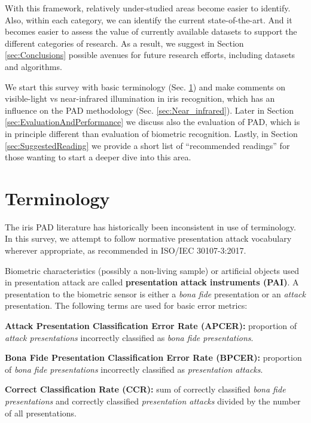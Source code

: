 \documentclass[format=acmsmall, review=false, timestamp=false]{acmart}
\begin{document}
With this framework, relatively under-studied areas become easier to identify. Also, within each category, we can identify the current state-of-the-art. And it becomes easier to assess the value of currently available datasets to support the different categories of research. As a result, we suggest in Section \ref{sec:Conclusions} possible avenues for future research efforts, including datasets and algorithms.

We start this survey with basic terminology (Sec. \ref{sec:Terminology}) and make comments on visible-light vs near-infrared illumination in iris recognition, which has an influence on the PAD methodology (Sec. \ref{sec:Near_infrared}). Later in Section \ref{sec:EvaluationAndPerformance} we discuss also the evaluation of PAD, which is in principle different than evaluation of biometric recognition. Lastly, in Section \ref{sec:SuggestedReading} we provide a short list of ``recommended readings'' for those wanting to start a deeper dive into this area.


\section{Terminology}
\label{sec:Terminology}

The iris PAD literature has historically been  inconsistent in use of terminology. In this survey, we attempt to follow normative presentation attack vocabulary wherever appropriate, as recommended in {ISO/IEC 30107-3:2017}. 

Biometric characteristics (possibly a non-living sample) or artificial objects used in presentation attack are called {\bf presentation attack instruments (PAI)}. A presentation to the biometric sensor is either a {\em bona fide} presentation or an {\em attack} presentation. The following terms are used for basic error metrics:
\begin{itemize}
\item {\bf Attack Presentation Classification Error Rate (APCER):} proportion of {\it attack presentations} incorrectly classified as {\it bona fide presentations}.

\item {\bf Bona Fide Presentation Classification Error Rate (BPCER):} proportion of {\it bona fide presentations} incorrectly classified as {\it presentation attacks}.

{\item {\bf Correct Classification Rate (CCR):} sum of correctly classified {\it bona fide presentations} and correctly classified {\it presentation attacks} divided by the number of all presentations.}

\end{itemize}
\end{document}
